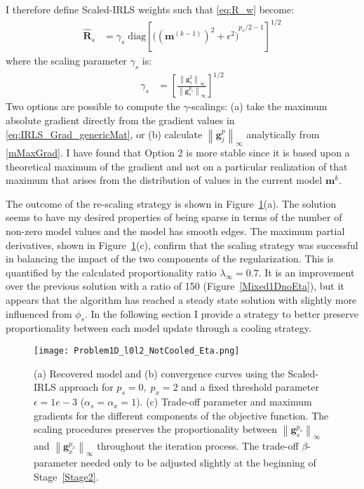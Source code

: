 I therefore define Scaled-IRLS weights such that \eqref{eq:R_w} become:
\begin{equation}\label{etaScale}
\begin{split}
\mathbf{\hat R}_s &= \gamma_s\; \text{diag} \left[{\Big( {({\mathbf{m}}^{(k-1)})}^{2} + \epsilon^2 \Big)}^{p_s/2 - 1} \right]^{1/2} 
\end{split}
\end{equation}
where the scaling parameter $\gamma_s$ is:
\begin{equation}\label{gamma_s}
\begin{split}
\gamma_s &= \left[\frac{ \left\| \mathbf{g}_s^2 \right\|_\infty}{\left\|\mathbf{g}_s^{p_s}\right\|_\infty}\right]^{1/2}
\end{split}
\end{equation}
Two options are possible to compute the $\gamma$-scalings: (a) take the maximum absolute gradient directly from the gradient values in \eqref{eq:IRLS_Grad_genericMat}, or (b) calculate $\left\|\mathbf{g}_j^p\right\|_\infty$ analytically from \eqref{mMaxGrad}. I have found that Option 2 is more stable since it is based upon a theoretical maximum of the gradient and not on a particular realization of that maximum that arises from the distribution of values in the current model $\mathbf{m}^{k}$.

The outcome of the re-scaling strategy is shown in Figure~\ref{Mixed1DnotCooledEta}(a). The solution seems to have my desired properties of being sparse in terms of the number of non-zero model values and the model has smooth edges. The maximum partial derivatives, shown in Figure~\ref{Mixed1DnotCooledEta}(c), confirm that the scaling strategy was successful in balancing the impact of the two components of the regularization. This is quantified by the calculated proportionality ratio $\lambda_\infty = 0.7$. It is an improvement over the previous solution with a ratio of 150 (Figure~\ref{Mixed1DnoEta}), but it appears that the algorithm has reached a steady state solution with slightly more influenced from $\phi_s$.
In the following section I provide a strategy to better preserve proportionality between each model update through a cooling strategy.
\begin{figure}
\texttt{[image: Problem1D\_l0l2\_NotCooled\_Eta.png]}
\caption{(a) Recovered model and (b) convergence curves using the Scaled-IRLS approach for $p_s=0,\;p_x=2$ and a fixed threshold parameter $\epsilon=1e-3$ ($\alpha_s=\alpha_x=1$). (c) Trade-off parameter and maximum gradients for the different components of the objective function. The scaling procedures preserves the proportionality between $\left\| \mathbf{g}^{p_s}_s \right\|_\infty$ and $\left\| \mathbf{g}^{p_x}_x \right\|_\infty$ throughout the iteration process. The trade-off $\beta$-parameter needed only to be adjusted slightly at the beginning of Stage~\ref{Stage2}.
}
\label{Mixed1DnotCooledEta}
\end{figure}

